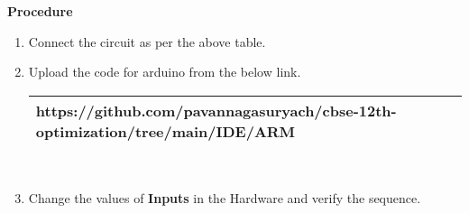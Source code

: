 \documentclass[journal,12pt,twocolumn]{IEEEtran}
\begin{document}
\textbf{Procedure}
\begin{enumerate}[label={\arabic*}.]
	\item Connect the circuit as per the above table.
	\item Upload the code for arduino from the below link.\\

\begin{tabularx}{0.45\textwidth}{
		| >{\centering\arraybackslash}X|}
	\hline
	https://github.com/pavannagasuryach/cbse-12th-optimization/tree/main/IDE/ARM \\
	\hline
\end{tabularx}\\
	\item Change the values of \textbf{Inputs} in the Hardware and verify the sequence.
\end{enumerate}
\end{document}

